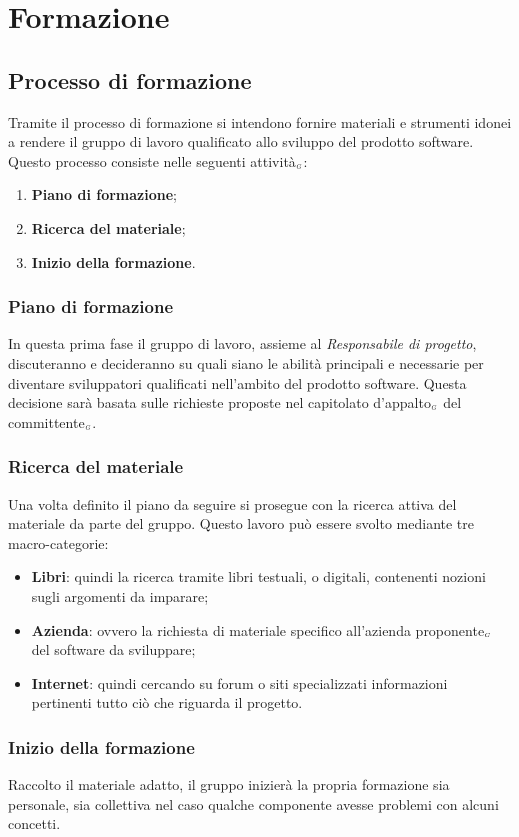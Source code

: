 \chapter{Formazione}\label{Formazione}
\section{Processo di formazione}\label{FormazioneProcessoDiFormazione}
Tramite il processo di formazione si intendono fornire materiali e strumenti idonei a rendere il gruppo di lavoro qualificato allo sviluppo del prodotto software.
Questo processo consiste nelle seguenti attività$_{\scaleto{G}{3pt}}$:
\begin{enumerate}
	\item \textbf{Piano di formazione};
	\item \textbf{Ricerca del materiale};
	\item \textbf{Inizio della formazione}.
\end{enumerate}
\subsection{Piano di formazione}\label{FormazioneProcessoDiFormazionePianoDiFormazione}
In questa prima fase il gruppo di lavoro, assieme al \textit{Responsabile di progetto}, discuteranno e decideranno su quali siano le abilità principali e necessarie per diventare sviluppatori qualificati nell'ambito del prodotto software.
Questa decisione sarà basata sulle richieste proposte nel capitolato d'appalto$_{\scaleto{G}{3pt}}$ del committente$_{\scaleto{G}{3pt}}$.
\subsection{Ricerca del materiale}\label{FormazioneProcessoDiFormazioneRicercaDelMateriale}
Una volta definito il piano da seguire si prosegue con la ricerca attiva del materiale da parte del gruppo.
Questo lavoro può essere svolto mediante tre macro-categorie:
\begin{itemize}
	\item \textbf{Libri}: quindi la ricerca tramite libri testuali, o digitali, contenenti nozioni sugli argomenti da imparare;
	\item \textbf{Azienda}: ovvero la richiesta di materiale specifico all'azienda proponente$_{\scaleto{G}{3pt}}$ del software da sviluppare;
	\item \textbf{Internet}: quindi cercando su forum o siti specializzati informazioni pertinenti tutto ciò che riguarda il progetto.
\end{itemize}
\subsection{Inizio della formazione}\label{FormazioneProcessoDiFormazioneInizioDellaFormazione}
Raccolto il materiale adatto, il gruppo inizierà la propria formazione sia personale, sia collettiva nel caso qualche componente avesse problemi con alcuni concetti.
